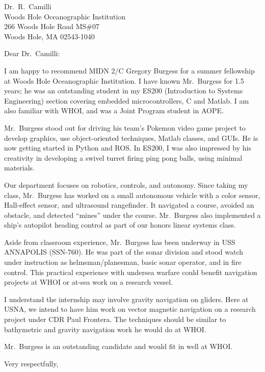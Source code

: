\documentclass[12pt]{wrceletter}
\date{\today}
\begin{document}
\begin{letter}{%
Dr.~R.~Camilli\\
Woods Hole Oceanographic Institution\\
266 Woods Hole Road MS\#07\\
Woods Hole, MA 02543-1040}

\opening{Dear Dr.~Camilli:}

I am happy to recommend MIDN 2/C Gregory Burgess for a summer fellowship at Woods Hole Oceanographic Institution. I have known Mr.~Burgess for 1.5 years; he was an outstanding student in my ES200 (Introduction to Systems Engineering) section covering embedded microcontrollers, C and Matlab. I am also familiar with WHOI, and was a Joint Program student in AOPE. 

Mr.~Burgess stood out for driving his team's Pokemon video game project to develop graphics, use object-oriented techniques, Matlab classes, and GUIs. He is now getting started in Python and ROS. In ES200, I was also impressed by his creativity in developing a swivel turret firing ping pong balls, using minimal materials. 

Our department focuses on robotics, controls, and autonomy. Since taking my class, Mr.~Burgess has worked on a small autonomous vehicle with a color sensor, Hall-effect sensor, and ultrasound rangefinder. It navigated a course, avoided an obstacle, and detected ``mines'' under the course. Mr.~Burgess also implemented a ship's autopilot heading control as part of our honors linear systems class. 

Aside from classroom experience, Mr.~Burgess has been underway in USS ANNAPOLIS (SSN-760). He was part of the sonar division and stood watch under instruction as helmsman/planesman, basic sonar operator, and in fire control. This practical experience with undersea warfare could benefit navigation projects at WHOI or at-sea work on a research vessel. 

I understand the internship may involve gravity navigation on gliders. Here at USNA, we intend to have him work on vector magnetic navigation on a research project under CDR Paul Frontera. The techniques should be similar to bathymetric and gravity navigation work he would do at WHOI. 

Mr.~Burgess is an outstanding candidate and would fit in well at WHOI.
\closing{Very respectfully,} %

\end{letter}
\end{document}
